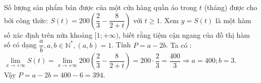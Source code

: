 \begin{bt}%
	Số lượng sản phẩm bán được của một cửa hàng quần áo trong $t$ (tháng) được cho bởi công thức: $S(t)=200\left(\dfrac{2}{3}-\dfrac{8}{2+t}\right)$ với $t \geq 1$. Xem $y=S(t)$ là một hàm số xác định trên nửa khoảng $[1 ;+\infty)$, biết rằng tiệm cận ngang của đồ thị hàm số có dạng $\dfrac{a}{b}, a, b \in \mathbb{N}^*,(a, b)=1$. Tính $P=a-2 b$.
	\loigiai
	{Ta có : $\lim\limits _{x \rightarrow+\infty} S(t)=\lim\limits _{x \rightarrow+\infty} 200\left(\dfrac{2}{3}-\dfrac{8}{2+t}\right)=200 \cdot \dfrac{2}{3}=\dfrac{400}{3} \Rightarrow a=400 ; b=3$.\\
		Vậy $P=a-2 b=400-6=394$.
	}
\end{bt}


